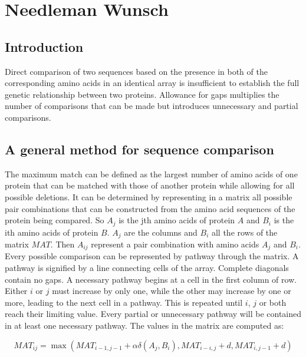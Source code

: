 \chapter{Needleman Wunsch}

\section{Introduction}
Direct comparison of two sequences based on the presence in both of the corresponding amino acids in an identical array is insufficient to establish the full genetic relationship between two proteins.
Allowance for gaps multiplies the number of comparisons that can be made but introduces unnecessary and partial comparisons.

\section{A general method for sequence comparison}
The maximum match can be defined as the largest number of amino acids of one protein that can be matched with those of another protein while allowing for all possible deletions.
It can be determined by representing in a matrix all possible pair combinations that can be constructed from the amino acid sequences of the protein being compared.
So $A_j$ is the jth amino acids of protein $A$ and $B_i$ is the ith amino acids of protein $B$.
$A_j$ are the columns and $B_i$ all the rows of the matrix $MAT$.
Then $A_{ij}$ represent a pair combination with amino acids $A_j$ and $B_i$.
Every possible comparison can be represented by pathway through the matrix.
A pathway is signified by a line connecting cells of the array.
Complete diagonals contain no gaps.
A necessary pathway begins at a cell in the first column of row.
Either $i$ or $j$ must increase by only one, while the other may increase by one or more, leading to the next cell in a pathway.
This is repeated until $i$, $j$ or both reach their limiting value.
Every partial or unnecessary pathway will be contained in at least one necessary pathway.
The values in the matrix are computed as:

$$MAT_{ij} = \max(MAT_{i-1, j-1} + \alpha\delta(A_j, B_i), MAT_{i-i, j} + d, MAT_{i,j-1} + d)$$

